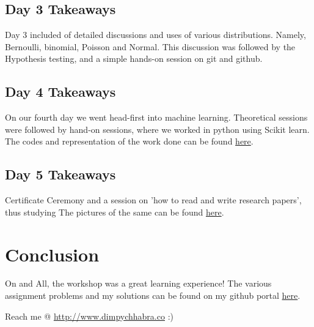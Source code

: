 \documentclass[a4paper]{article}
\begin{document}
\subsection{Day 3 Takeaways }

Day 3 included of detailed discussions and uses of various distributions. Namely, Bernoulli, binomial, Poisson and Normal. \newline
This discussion was followed by the Hypothesis testing, and a simple hands-on session on git and github.
	
\subsection{Day 4 Takeaways }

On our fourth day we went head-first into machine learning. Theoretical sessions were followed by hand-on sessions, where we worked in python using Scikit learn. \newline
The codes and representation of the work done can be found  \href{https://github.com/dimpy-chhabra/ACM_Winter_Workshop/tree/master/Day_4/Scikit-Learn}{here}.

\subsection{Day 5 Takeaways }

Certificate Ceremony and a session on 'how to read and write research papers', thus studying \cite{greenwade93} \newline
The pictures of the same can be found  \href{https://drive.google.com/drive/folders/17kIdg3UKXfFie57A472nyZtZ7WvmDR4E}{here}.
	

\section{Conclusion}
On and All, the workshop was a great learning experience!
The various assignment problems and my solutions can be found on my github portal \href{https://github.com/dimpy-chhabra/ACM_Winter_Workshop}{here}.
\newline

%

Reach me @
\url{http://www.dimpychhabra.co} :)



\end{document}
